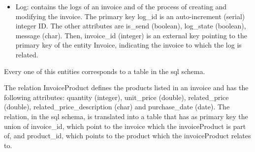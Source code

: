 \begin{itemize}
	\item Log: contains the logs of an invoice and of the process of creating and modifying the invoice. The primary key log\_id is an auto-increment (serial) integer ID. The other attributes are is\_send (boolean), log\_state (boolean), message (char). Then, invoice\_id (integer) is an external key pointing to the primary key of the entity Invoice, indicating the invoice to which the log is related.
\end{itemize}
Every one of this entities corresponds to a table in the sql schema.

The relation InvoiceProduct defines the products listed in an invoice and has the following attributes: quantity (integer), unit\_price (double), related\_price (double), related\_price\_description (char) and purchase\_date (date). The relation, in the sql schema, is translated into a table that has as primary key the union of invoice\_id, which point to the invoice which the invoiceProduct is part of, and product\_id, which points to the product which the invoiceProduct relates to.


